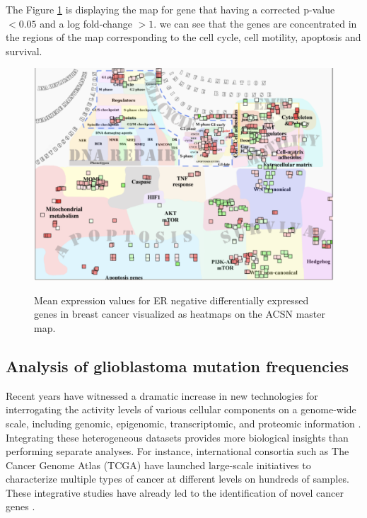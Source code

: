 \documentclass{article}
\begin{document}
The Figure \ref{fig:mainz} is displaying the map for gene that having a
corrected p-value $< 0.05$ and a log fold-change $>1$. we can see that the genes
are concentrated in the regions of the map corresponding to the cell cycle, cell
motility, apoptosis and survival.

\begin{figure}[!ht]
  \caption{Mean expression values for ER negative differentially expressed
  genes in breast cancer visualized as heatmaps on the ACSN master map.} 
  \centering
  \includegraphics[width=\textwidth]{figures/mainz_acsn.pdf}
  \label{fig:mainz}
\end{figure}

\subsection{Analysis of glioblastoma mutation frequencies}

Recent years have witnessed a dramatic increase in new technologies for
interrogating the activity levels of various cellular components on a
genome-wide scale, including genomic, epigenomic, transcriptomic, and proteomic
information \cite{hawkins2010next}. Integrating these heterogeneous datasets
provides more biological insights than performing separate analyses. For
instance, international consortia such as The Cancer Genome Atlas (TCGA) have
launched large-scale initiatives to characterize multiple types of cancer at
different levels on hundreds of samples.  These integrative studies have
already led to the identification of novel cancer genes
\cite{mclendon2008comprehensive}. 
\end{document}
